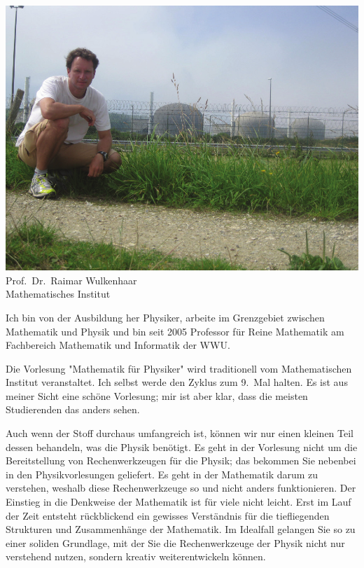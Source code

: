 \begin{multicols}{2}
\begin{center}
\includegraphics[width=0.9\columnwidth]{res/vorstellungsfotos/wulkenhaar.png}\\
Prof.\ Dr.\ Raimar Wulkenhaar\\
Mathematisches Institut
\end{center}

Ich bin von der Ausbildung her Physiker, arbeite im Grenzgebiet zwischen Mathematik und Physik und bin seit 2005 Professor für Reine Mathematik am Fachbereich Mathematik und Informatik der WWU.

Die Vorlesung "Mathematik für Physiker" wird traditionell vom Mathematischen Institut veranstaltet. Ich selbst werde den Zyklus zum 9.~Mal halten. Es ist aus meiner Sicht eine schöne Vorlesung; mir ist aber klar, dass die meisten Studierenden das anders sehen.

Auch wenn der Stoff durchaus umfangreich ist, können wir nur einen kleinen Teil dessen behandeln, was die Physik benötigt. Es geht in der Vorlesung nicht um die Bereitstellung von Rechenwerkzeugen für die Physik; das bekommen Sie nebenbei in den Physikvorlesungen geliefert. Es geht in der Mathematik darum zu verstehen, weshalb diese Rechenwerkzeuge so und nicht anders funktionieren. Der Einstieg in die Denkweise der Mathematik ist für viele nicht leicht. Erst im Lauf der Zeit entsteht rückblickend ein gewisses Verständnis für die tiefliegenden Strukturen und Zusammenhänge der Mathematik. Im Idealfall gelangen Sie so zu einer soliden Grundlage, mit der Sie die Rechenwerkzeuge der Physik nicht nur verstehend nutzen, sondern kreativ weiterentwickeln können.



\end{multicols}
